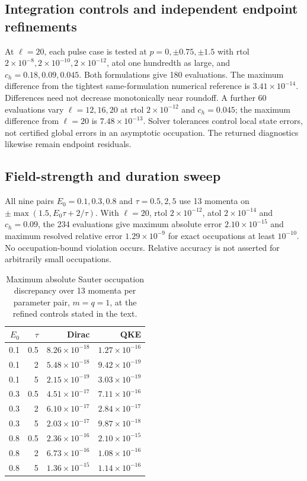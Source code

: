 \documentclass[11pt,a4paper]{article}
\begin{document}
\subsection{Integration controls and independent endpoint refinements}
\label{sec:refinement}
At $\ell=20$, each pulse case is tested at $p=0,\pm0.75,\pm1.5$ with rtol $2\times10^{-8},2\times10^{-10},2\times10^{-12}$, atol one hundredth as large, and $c_h=0.18,0.09,0.045$. Both formulations give 180 evaluations. The maximum difference from the tightest same-formulation numerical reference is $3.41\times10^{-14}$. Differences need not decrease monotonically near roundoff. A further 60 evaluations vary $\ell=12,16,20$ at rtol $2\times10^{-12}$ and $c_h=0.045$; the maximum difference from $\ell=20$ is $7.48\times10^{-13}$. Solver tolerances control local state errors, not certified global errors in an asymptotic occupation. The returned diagnostics likewise remain endpoint residuals.

\subsection{Field-strength and duration sweep}
All nine pairs $E_0=0.1,0.3,0.8$ and $\tau=0.5,2,5$ use 13 momenta on $\pm\max(1.5,E_0\tau+2/\tau)$. With $\ell=20$, rtol $2\times10^{-12}$, atol $2\times10^{-14}$ and $c_h=0.09$, the 234 evaluations give maximum absolute error $2.10\times10^{-15}$ and maximum resolved relative error $1.29\times10^{-9}$ for exact occupations at least $10^{-10}$. No occupation-bound violation occurs. Relative accuracy is not asserted for arbitrarily small occupations.
\begin{table}[htbp]\centering\small
\caption{Maximum absolute Sauter occupation discrepancy over 13 momenta per parameter pair, $m=q=1$, at the refined controls stated in the text.}\label{tab:parameter}
\begin{tabular}{rrrr}\toprule
$E_0$ & $\tau$ & Dirac & QKE\\\midrule
0.1 & 0.5 & $8.26\times10^{-18}$ & $1.27\times10^{-16}$\\
0.1 & 2 & $5.48\times10^{-18}$ & $9.42\times10^{-19}$\\
0.1 & 5 & $2.15\times10^{-19}$ & $3.03\times10^{-19}$\\
0.3 & 0.5 & $4.51\times10^{-17}$ & $7.11\times10^{-16}$\\
0.3 & 2 & $6.10\times10^{-17}$ & $2.84\times10^{-17}$\\
0.3 & 5 & $2.03\times10^{-17}$ & $9.87\times10^{-18}$\\
0.8 & 0.5 & $2.36\times10^{-16}$ & $2.10\times10^{-15}$\\
0.8 & 2 & $6.73\times10^{-16}$ & $1.08\times10^{-16}$\\
0.8 & 5 & $1.36\times10^{-15}$ & $1.14\times10^{-16}$\\
\bottomrule\end{tabular}\end{table}
\end{document}
